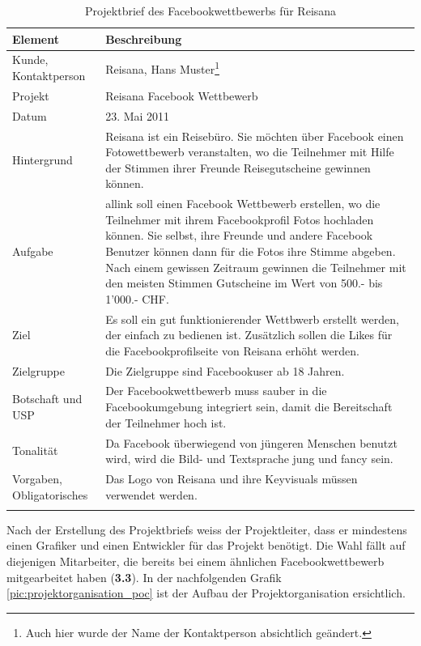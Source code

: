 \begin{longtable}{lp{10cm}}
    \toprule \textbf{Element} & \textbf{Beschreibung} \\
    \midrule Kunde, Kontaktperson &
        Reisana, Hans Muster\footnote{Auch hier wurde der Name der Kontaktperson
        absichtlich geändert.} \\
    \midrule Projekt &
        Reisana Facebook Wettbewerb \\
    \midrule Datum &
        23. Mai 2011 \\
    \midrule Hintergrund &
        Reisana ist ein Reisebüro. Sie möchten über Facebook einen Fotowettbewerb
        veranstalten, wo die Teilnehmer mit Hilfe der Stimmen ihrer Freunde 
        Reisegutscheine gewinnen können. \\
    \midrule Aufgabe &
        allink soll einen Facebook Wettbewerb erstellen, wo die Teilnehmer mit
        ihrem Facebookprofil Fotos hochladen können. Sie selbst, ihre Freunde
        und andere Facebook Benutzer können dann für die Fotos ihre Stimme abgeben.
        Nach einem gewissen Zeitraum gewinnen die Teilnehmer mit den meisten 
        Stimmen Gutscheine im Wert von 500.- bis 1'000.- CHF. \\
    \midrule Ziel &
        Es soll ein gut funktionierender Wettbwerb erstellt werden, der einfach
        zu bedienen ist. Zusätzlich sollen die Likes für die Facebookprofilseite von
        Reisana erhöht werden. \\
    \midrule Zielgruppe &
        Die Zielgruppe sind Facebookuser ab 18 Jahren. \\
    \midrule Botschaft und USP &
        Der Facebookwettbewerb muss sauber in die Facebookumgebung integriert 
        sein, damit die Bereitschaft der Teilnehmer hoch ist. \\
    \midrule Tonalität &
        Da Facebook überwiegend von jüngeren Menschen benutzt wird, wird die
        Bild- und Textsprache jung und fancy sein. \\
    \midrule Vorgaben, Obligatorisches &
        Das Logo von Reisana und ihre Keyvisuals müssen verwendet werden. \\
    \bottomrule
    \caption[Projektbrief des Facebookwettbewerbs für Hotelplan]{Projektbrief des 
        Facebookwettbewerbs für Reisana\footnotemark}
    \label{tab:projektbrief_poc}
\end{longtable}

Nach der Erstellung des Projektbriefs weiss der Projektleiter, dass er mindestens
einen Grafiker und einen Entwickler für das Projekt benötigt. Die Wahl fällt
auf diejenigen Mitarbeiter, die bereits bei einem ähnlichen Facebookwettbewerb
mitgearbeitet haben (\textbf{3.3}). In der nachfolgenden Grafik \ref{pic:projektorganisation_poc} 
ist der Aufbau der Projektorganisation ersichtlich.


